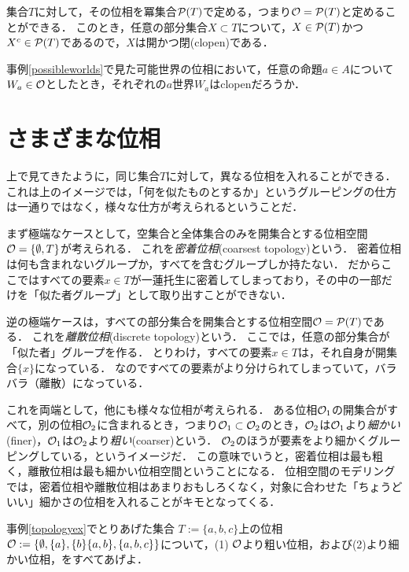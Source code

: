 \documentclass[11pt,a4paper, dvipdfmx]{jsarticle}
\begin{document}
\begin{example}
 集合$T$に対して，その位相を冪集合$\mathcal{P}(T)$で定める，つまり$\mathcal{O} = \mathcal{P}(T)$と定めることができる．
 このとき，任意の部分集合$X \subset T$について，$X \in \mathcal{P}(T)$かつ$X^c \in \mathcal{P}(T)$であるので，$X$は開かつ閉(clopen)である．
\end{example}

\begin{example}
 事例\ref{possibleworlds}で見た可能世界の位相において，任意の命題$a \in A$について$W_a \in \mathcal{O}$としたとき，それぞれの$a$世界$W_a$はclopenだろうか．
\end{example}


\section{さまざまな位相}
上で見てきたように，同じ集合$T$に対して，異なる位相を入れることができる．
これは上のイメージでは，「何を似たものとするか」というグルーピングの仕方は一通りではなく，様々な仕方が考えられるということだ．

まず極端なケースとして，空集合と全体集合のみを開集合とする位相空間$\mathcal{O} = \{\emptyset, T\}$が考えられる．
これを\emph{密着位相}(coarsest topology)という．
密着位相は何も含まれないグループか，すべてを含むグループしか持たない．
だからここではすべての要素$x \in T$が一蓮托生に密着してしまっており，その中の一部だけを「似た者グループ」として取り出すことができない．

逆の極端ケースは，すべての部分集合を開集合とする位相空間$\mathcal{O} = \mathcal{P}(T)$である．
これを\emph{離散位相}(discrete topology)という．
ここでは，任意の部分集合が「似た者」グループを作る．
とりわけ，すべての要素$x \in T$は，それ自身が開集合$\{x\}$になっている．
なのですべての要素がより分けられてしまっていて，バラバラ（離散）になっている．

これを両端として，他にも様々な位相が考えられる．
ある位相$\mathcal{O}_1$の開集合がすべて，別の位相$\mathcal{O}_2$に含まれるとき，つまり$\mathcal{O}_1 \subset \mathcal{O}_2$のとき，$\mathcal{O}_2$は$\mathcal{O}_1$より\emph{細かい}(finer)，$\mathcal{O}_1$は$\mathcal{O}_2$より\emph{粗い}(coarser)という．
$\mathcal{O}_2$のほうが要素をより細かくグルーピングしている，というイメージだ．
この意味でいうと，密着位相は最も粗く，離散位相は最も細かい位相空間ということになる．
位相空間のモデリングでは，密着位相や離散位相はあまりおもしろくなく，対象に合わせた「ちょうどいい」細かさの位相を入れることがキモとなってくる．

\begin{exercise}
事例\ref{topologyex}でとりあげた集合 $T:=\{a, b, c\}$上の位相$\mathcal{O} := \{ \emptyset, \{a \}, \{b\} \{a,b\}, \{a,b,c\} \}$について，(1) $\mathcal{O}$より粗い位相，および(2)より細かい位相，をすべてあげよ．
\end{exercise}
\end{document}
